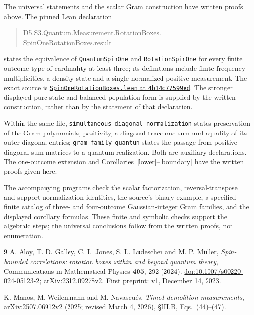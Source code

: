 \documentclass[11pt]{article}
\begin{document}
The universal statements and the scalar Gram construction have written
proofs above. The pinned Lean declaration
\begin{quote}\small\ttfamily
D5.S3.Quantum.Measurement.RotationBoxes.\\
SpinOneRotationBoxes.result
\end{quote}
states the equivalence of
\texttt{QuantumSpinOne} and \texttt{RotationSpinOne} for every finite
outcome type of cardinality at least three; its definitions include finite
frequency multiplicities, a density state and a single normalized positive
measurement. The exact source is
\href{https://github.com/the-omega-institute/trureturing/blob/4b14c77599edfd8a52c0a7926d038f4121ca7db1/D5/S3/Quantum/Measurement/RotationBoxes/SpinOneRotationBoxes.lean}{\texttt{SpinOneRotationBoxes.lean} at \texttt{4b14c77599ed}}.
The stronger displayed pure-state and balanced-population form is supplied
by the written construction, rather than by the statement of that declaration.

Within the same file, \texttt{simultaneous\_\allowbreak diagonal\_\allowbreak normalization}
states preservation of the Gram polynomials, positivity, a diagonal
trace-one sum and equality of its outer diagonal entries;
\texttt{gram\_\allowbreak family\_\allowbreak quantum} states the passage from positive
diagonal-sum matrices to a quantum realization. Both are auxiliary
 declarations. The one-outcome extension and Corollaries~\ref{lower}--\ref{boundary}
have the written proofs given here.

The accompanying programs check the scalar factorization,
reversal-transpose and support-normalization identities, the source's
binary example, a specified finite catalog of three- and four-outcome
Gaussian-integer Gram families, and the displayed corollary formulas.
These finite and symbolic checks support the algebraic steps; the
universal conclusions follow from the written proofs, not enumeration.

\begin{thebibliography}{9}
A. Aloy, T. D. Galley, C. L. Jones, S. L. Ludescher and M. P. M\"uller,
\emph{Spin-bounded correlations: rotation boxes within and beyond quantum theory},
Communications in Mathematical Physics \textbf{405}, 292 (2024).
\href{https://doi.org/10.1007/s00220-024-05123-2}{doi:10.1007/s00220-024-05123-2};
\href{https://arxiv.org/abs/2312.09278v2}{arXiv:2312.09278v2}.
First preprint: \href{https://arxiv.org/abs/2312.09278v1}{v1}, December 14, 2023.

K. Manos, M. Weilenmann and M. Navascu\'es,
\emph{Timed demolition measurements},
\href{https://arxiv.org/abs/2507.06912v2}{arXiv:2507.06912v2}
(2025; revised March 4, 2026), \S III.B, Eqs.~(44)--(47).
\end{thebibliography}
\end{document}
